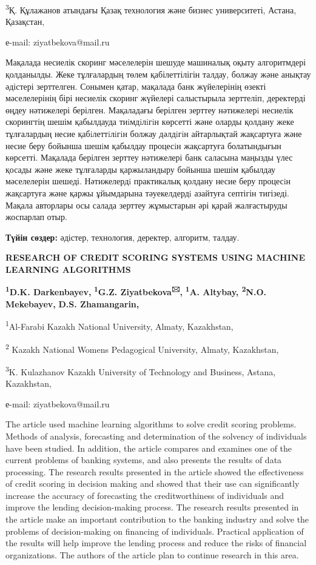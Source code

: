 \textsuperscript{3}Қ. Құлажанов атындағы Қазақ технология және бизнес
университеті, Астана, Қазақстан,

е-mail: ziyatbekova@mail.ru

Мақалада несиелік скоринг мәселелерін шешуде машиналық оқыту
алгоритмдері қолданылды. Жеке тұлғалардың төлем қабілеттілігін талдау,
болжау және анықтау әдістері зерттелген. Сонымен қатар, мақалада банк
жүйелерінің өзекті мәселелерінің бірі несиелік скоринг жүйелері
салыстырыла зерттеліп, деректерді өңдеу нәтижелері берілген. Мақаладағы
берілген зерттеу нәтижелерi несиелік скорингтің шешім қабылдауда
тиiмдiлiгiн көрсетті және оларды қолдану жеке тұлғалардың несие
қабiлеттiлiгiн болжау дәлдiгiн айтарлықтай жақсартуға және несие беру
бойынша шешiм қабылдау процесiн жақсартуға болатындығын көрсетті.
Мақалада берілген зерттеу нәтижелері банк саласына маңызды үлес қосады
және жеке тұлғаларды қаржыландыру бойынша шешім қабылдау мәселелерін
шешеді. Нәтижелердi практикалық қолдану несие беру процесiн жақсартуға
және қаржы ұйымдарына тәуекелдердi азайтуға септігін тигізеді. Мақала
авторлары осы салада зерттеу жұмыстарын әрі қарай жалғастыруды жоспарлап
отыр.

{\bfseries Түйін сөздер:} әдістер, технология, деректер, алгоритм, талдау.

{\bfseries RESEARCH OF CREDIT SCORING SYSTEMS USING MACHINE LEARNING
ALGORITHMS}

{\bfseries \textsuperscript{1}D.K. Darkenbayev,}
{\bfseries \textsuperscript{1}G.Z. Ziyatbekova\textsuperscript{🖂},}
{\bfseries \textsuperscript{1}A. Altybay, \textsuperscript{2}N.O.
Mekebayev,} {\bfseries D.S. Zhamangarin,}

\textsuperscript{1}Al-Farabi Kazakh National University, Almaty,
Kazakhstan,

\textsuperscript{2} Kazakh National Women\textquotesingle s Pedagogical
University, Almaty, Kazakhstan,

\textsuperscript{3}K. Kulazhanov Kazakh University of Technology and
Business, Astana, Kazakhstan,

е-mail: ziyatbekova@mail.ru

The article used machine learning algorithms to solve credit scoring
problems. Methods of analysis, forecasting and determination of the
solvency of individuals have been studied. In addition, the article
compares and examines one of the current problems of banking systems,
and also presents the results of data processing. The research results
presented in the article showed the effectiveness of credit scoring in
decision making and showed that their use can significantly increase the
accuracy of forecasting the creditworthiness of individuals and improve
the lending decision-making process. The research results presented in
the article make an important contribution to the banking industry and
solve the problems of decision-making on financing of individuals.
Practical application of the results will help improve the lending
process and reduce the risks of financial organizations. The authors of
the article plan to continue research in this area.


